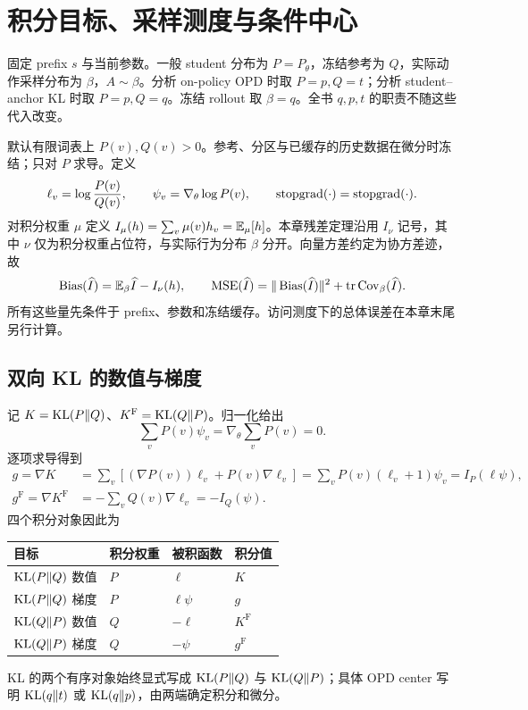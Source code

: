 \section{积分目标、采样测度与条件中心}
\label{est:targets}

固定 prefix $s$ 与当前参数。一般 student 分布为 $P=P_\theta$，冻结参考为 $Q$，实际动作采样分布为 $\beta$，$A\sim\beta$。分析 on-policy OPD 时取 $P=p,Q=t$；分析 student--anchor KL 时取 $P=p,Q=q$。冻结 rollout 取 $\beta=q$。全书 $q,p,t$ 的职责不随这些代入改变。

默认有限词表上 $P(v),Q(v)>0$。参考、分区与已缓存的历史数据在微分时冻结；只对 $P$ 求导。定义
\begin{equation}
\ell_v=\log\frac{P(v)}{Q(v)},\qquad
\psi_v=\nabla_\theta\log P(v),\qquad
\operatorname{stopgrad}(\cdot)=\operatorname{stopgrad}(\cdot).
\end{equation}
对积分权重 $\mu$ 定义 $I_\mu(h)=\sum_v\mu(v)h_v=\mathbb E_\mu[h]$。本章残差定理沿用 $I_\nu$ 记号，其中 $\nu$ 仅为积分权重占位符，与实际行为分布 $\beta$ 分开。向量方差约定为协方差迹，故
\begin{equation}
\operatorname{Bias}(\widehat I)=\mathbb E_\beta\widehat I-I_\nu(h),\qquad
\operatorname{MSE}(\widehat I)=\|\operatorname{Bias}(\widehat I)\|^2+\operatorname{tr}\operatorname{Cov}_\beta(\widehat I).
\end{equation}
所有这些量先条件于 prefix、参数和冻结缓存。访问测度下的总体误差在本章末尾另行计算。

\subsection{双向 KL 的数值与梯度}
\label{est:four-targets}
记 $K=\operatorname{KL}(P\Vert Q)$、$K^{\mathrm F}=\operatorname{KL}(Q\Vert P)$。归一化给出
\begin{equation}
\sum_vP(v)\psi_v=\nabla_\theta\sum_vP(v)=0.
\end{equation}
逐项求导得到
\begin{align}
g=\nabla K
&=\sum_v[(\nabla P(v))\ell_v+P(v)\nabla\ell_v]
=\sum_vP(v)(\ell_v+1)\psi_v
=I_P(\ell\psi),\\
g^{\mathrm F}=\nabla K^{\mathrm F}
&=-\sum_vQ(v)\nabla\ell_v=-I_Q(\psi).
\end{align}
四个积分对象因此为
\begin{center}
\begin{tabular}{llll}
\toprule
目标 & 积分权重 & 被积函数 & 积分值\\
\midrule
$\operatorname{KL}(P\Vert Q)$ 数值 & $P$ & $\ell$ & $K$\\
$\operatorname{KL}(P\Vert Q)$ 梯度 & $P$ & $\ell\psi$ & $g$\\
$\operatorname{KL}(Q\Vert P)$ 数值 & $Q$ & $-\ell$ & $K^{\mathrm F}$\\
$\operatorname{KL}(Q\Vert P)$ 梯度 & $Q$ & $-\psi$ & $g^{\mathrm F}$\\
\bottomrule
\end{tabular}
\end{center}
KL 的两个有序对象始终显式写成 $\operatorname{KL}(P\Vert Q)$ 与 $\operatorname{KL}(Q\Vert P)$；具体 OPD center 写明 $\operatorname{KL}(q\Vert t)$ 或 $\operatorname{KL}(q\Vert p)$，由两端确定积分和微分。

